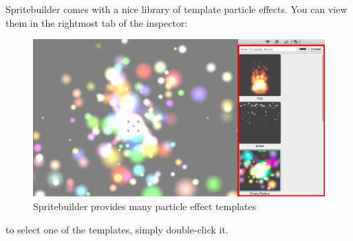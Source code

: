 \documentclass{scrreprt}
\begin{document}
Spritebuilder comes with a nice library of template particle effects. You can
view them in the rightmost tab of the inspector:
\begin{figure}[H]
		\centering
		\includegraphics[width=375pt]{images/particles/Spritebuilder_ParticleEffect_Templates.png}   
		\caption{Spritebuilder provides many particle effect templates}
\end{figure}
to select one of the templates, simply double-click it.
\end{document}
